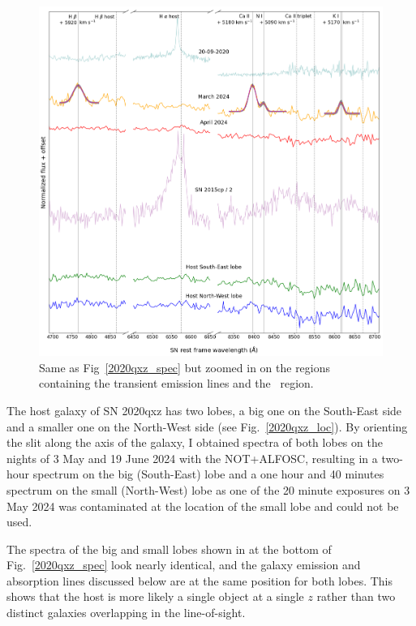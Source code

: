 \documentclass[a4paper,oneside,12pt, class=Latex/Classes/PhDthesisPSnPDF, crop=false]{standalone}
\begin{document}
\begin{figure}
    \centering
    \includegraphics[width=\textwidth]{../Images/chapter_5/2020qxz_spec_zoom.png}
    \caption{Same as Fig~\ref{2020qxz_spec} but zoomed in on the regions containing the transient emission lines and the \Halpha\ region.}
    \label{2020qxz_spec_zoom}
\end{figure}

The host galaxy of SN 2020qxz has two lobes, a big one on the South-East side and a smaller one on the North-West side (see Fig.~\ref{2020qxz_loc}). By orienting the slit along the axis of the galaxy, I obtained spectra of both lobes on the nights of 3 May and 19 June 2024 with the NOT+ALFOSC, resulting in a two-hour spectrum on the big (South-East) lobe and a one hour and 40 minutes spectrum on the small (North-West) lobe as one of the 20 minute exposures on 3 May 2024 was contaminated at the location of the small lobe and could not be used. 

The spectra of the big and small lobes shown in at the bottom of Fig.~\ref{2020qxz_spec} look nearly identical, and the galaxy emission and absorption lines discussed below are at the same position for both lobes. This shows that the host is more likely a single object at a single $z$ rather than two distinct galaxies overlapping in the line-of-sight.
\end{document}
